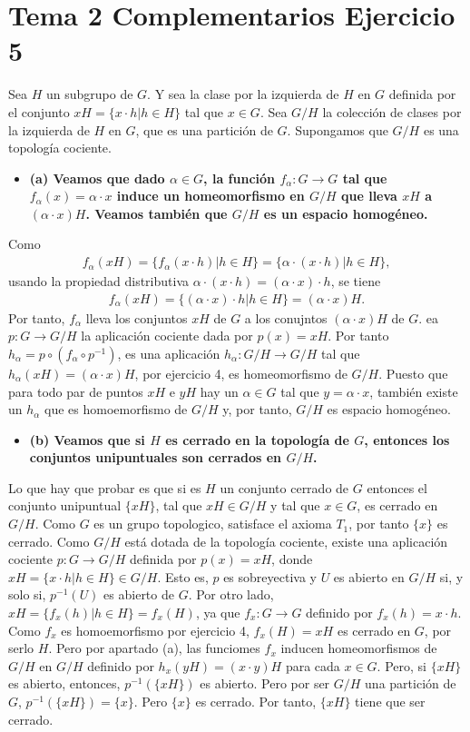 \documentclass{article}
\begin{document}
\section{Tema 2 Complementarios Ejercicio 5}
Sea $H$ un subgrupo de $G$. Y sea la clase por la izquierda de $H$ en $G$ definida por el conjunto $xH=\{x\cdot h| h\in H\}$ tal que $x\in G$. Sea $G/H$ la colección de clases por la izquierda de $H$ en $G$, que es una partición de $G$. Supongamos que $G/H$ es una topología cociente.
\begin{itemize}
\item \bf (a) \rm Veamos que dado $\alpha \in G$, la función $f_\alpha :G\rightarrow G$ tal que $f_\alpha(x)=\alpha \cdot x$ induce un homeomorfismo en $G/H$ que lleva $xH$ a $(\alpha \cdot x) H$. Veamos también que $G/H$ es un espacio homogéneo.
\end{itemize}
Como 
\begin{eqnarray}
f_\alpha(xH)=\{f_{\alpha}(x\cdot h)|h\in H\}=\{\alpha \cdot (x\cdot h)|h\in H\},\nonumber
\end{eqnarray}
usando la propiedad distributiva $\alpha \cdot (x\cdot h)=(\alpha \cdot x)\cdot h$, se tiene
\begin{eqnarray}
f_\alpha(xH)=\{(\alpha \cdot x)\cdot h|h\in H\}=(\alpha \cdot x)H.\nonumber
\end{eqnarray}
Por tanto, $f_\alpha$ lleva los conjuntos $xH$ de $G$ a los conujntos $(\alpha \cdot x)H$ de $G$. ea $p:G\rightarrow G/H$ la aplicación cociente dada por $p(x)=xH$. Por tanto $h_\alpha=p\circ (f_\alpha\circ p^{-1})$, es una aplicación $h_\alpha:G/H\rightarrow G/H$ tal que $h_\alpha(xH)=(\alpha \cdot x)H$, por ejercicio 4, es homeomorfismo de $G/H$. Puesto que para todo par de puntos $xH$ e $yH$ hay un $\alpha\in G$ tal que $y=\alpha\cdot x$, también existe un $h_\alpha$ que es homoemorfismo de $G/H$ y, por tanto, $G/H$ es espacio homogéneo.
\begin{itemize}
\item \bf (b) \rm Veamos que si $H$ es cerrado en la topología de $G$, entonces los conjuntos unipuntuales son cerrados en $G/H$.
\end{itemize}
Lo que hay que probar es que si es $H$ un conjunto cerrado de $G$ entonces el conjunto unipuntual $\{xH\}$, tal que $xH\in G/H$ y tal que $x\in G$, es cerrado en $G/H$. Como $G$ es un grupo topologico, satisface el axioma $T_1$, por tanto $\{x\}$ es cerrado. Como $G/H$ está dotada de la topología cociente, existe una aplicación cociente $p:G\rightarrow G/H$ definida por $p(x)=xH$, donde $xH=\{x\cdot h|h\in H\}\in G/H$. Esto es, $p$ es sobreyectiva y $U$ es abierto en $G/H$ si, y solo si, $p^{-1}(U)$ es abierto de $G$. Por otro lado, $xH=\{f_x(h)|h\in H\}=f_x(H)$, ya que $f_x:G\rightarrow G$ definido por $f_x(h)=x\cdot h$. Como $f_x$ es homoemorfismo por ejercicio 4, $f_x(H)=xH$ es cerrado en $G$, por serlo $H$. Pero por apartado (a), las funciomes $f_x$  inducen homeomorfismos de $G/H$ en $G/H$ definido por $h_x(yH)= (x\cdot y)H$ para cada $x\in G$. Pero, si $\{xH\}$ es abierto, entonces, $ p^{-1}(\{xH\})$ es abierto. Pero por ser $G/H$ una partición de $G$, $ p^{-1}(\{xH\})=\{x\}$. Pero $\{x\}$ es cerrado. Por tanto, $\{xH\}$ tiene que ser cerrado.
\end{document}

